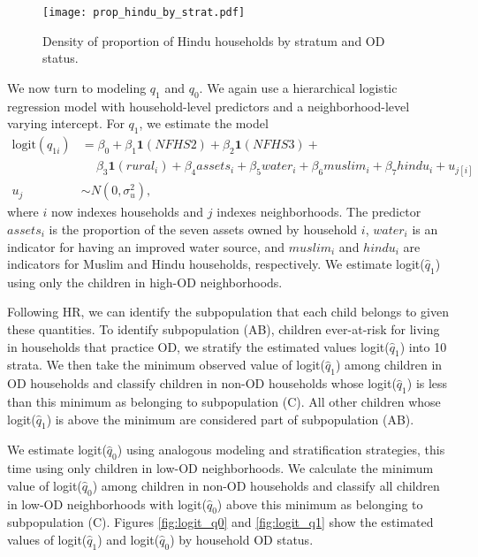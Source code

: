 \documentclass[12pt,a4paper,titlepage]{article}
\begin{document}
\begin{appendices}
\begin{figure}
	\centering
	\texttt{[image: prop\_hindu\_by\_strat.pdf]}
	\caption{Density of proportion of Hindu households by stratum and OD status.}
	\label{fig:hin_dens}
\end{figure}

We now turn to modeling $q_1$ and $q_0$. We again use a hierarchical logistic regression model with household-level predictors and a neighborhood-level varying intercept. For $q_1$, we estimate the model
\begin{align*}
	\text{logit}(q_{1i}) &= \beta_0 + \beta_1 \mathbf{1}(NFHS2) + \beta_2 \mathbf{1}(NFHS3) + \\
	&\quad~ \beta_3 \mathbf{1}(rural_i) + \beta_4 assets_i + \beta_5 water_i + \beta_6 muslim_i + \beta_7 hindu_i + u_{j[i]} \\
	u_j &\sim N(0, \sigma_u^2),
\end{align*} 
where $i$ now indexes households and $j$ indexes neighborhoods. The predictor $assets_i$ is the proportion of the seven assets owned by household $i$, $water_i$ is an indicator for having an improved water source, and $muslim_i$ and $hindu_i$ are indicators for Muslim and Hindu households, respectively. We estimate logit($\widehat{q}_1$) using only the children in high-OD neighborhoods.

Following HR, we can identify the subpopulation that each child belongs to given these quantities. To identify subpopulation (AB), children ever-at-risk for living in households that practice OD, we stratify the estimated values logit($\widehat{q}_1$) into 10 strata. We then take the minimum observed value of logit($\widehat{q}_1$) among children in OD households and classify children in non-OD households whose logit($\widehat{q}_1$) is less than this minimum as belonging to subpopulation (C). All other children whose logit($\widehat{q}_1$) is above the minimum are considered part of subpopulation (AB).

We estimate logit($\widehat{q}_0$) using analogous modeling and stratification strategies, this time using only children in low-OD neighborhoods. We calculate the minimum value of logit($\widehat{q}_0$) among children in non-OD households and classify all children in low-OD neighborhoods with logit($\widehat{q}_0$) above this minimum as belonging to subpopulation (C). Figures \ref{fig:logit_q0} and \ref{fig:logit_q1} show the estimated values of logit($\widehat{q}_1$) and logit($\widehat{q}_0$) by household OD status.


\end{appendices}
\end{document}
